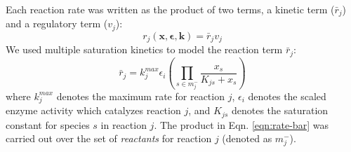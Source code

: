 \documentclass[12pt]{article}
\begin{document}
Each reaction rate was written as the product of two terms, a kinetic term ($\bar{r}_{j}$) and a regulatory term ($v_{j}$):
\begin{equation}\label{eqn:rate-factor}
	r_{j}\left(\mathbf{x},\mathbf{\epsilon},\mathbf{k}\right) = \bar{r}_{j}v_{j}
\end{equation}We used multiple saturation kinetics to model the reaction term $\bar{r}_{j}$:
\begin{equation}\label{eqn:rate-bar}
	\bar{r}_{j} = k_{j}^{max}\epsilon_{i}\left(\prod_{s\in{m_{j}^{-}}}\frac{x_{s}}{K_{js} + x_{s}}\right)
\end{equation}where $k_{j}^{max}$ denotes the maximum rate for reaction $j$, $\epsilon_{i}$ denotes the scaled enzyme activity which catalyzes reaction $j$, and
$K_{js}$ denotes the saturation constant for species $s$ in reaction $j$. 
The product in Eqn. \eqref{eqn:rate-bar} was carried out over the set of \textit{reactants} for reaction $j$ (denoted as $m_{j}^{-}$). 
\end{document}
